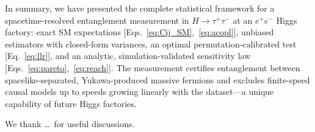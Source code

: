 \documentclass[prl,twocolumn,superscriptaddress,floatfix]{revtex4-2}
\newcommand{\ee}{e^+e^-}
\newcommand{\tautau}{\tau^+\tau^-}
\newcommand{\Htautau}{H\!\to\!\tautau}
\begin{document}
In summary, we have presented the complete statistical framework for
a spacetime-resolved entanglement measurement in $\Htautau$ at an
$\ee$ Higgs factory: exact SM expectations
[Eqs.~\eqref{eq:Cij_SM},~\eqref{eq:acopl}], unbiased estimators with
closed-form variances, an optimal permutation-calibrated test
[Eq.~\eqref{eq:llr}], and an analytic, simulation-validated
sensitivity law [Eqs.~\eqref{eq:pareto},~\eqref{eq:reach}].  The
measurement certifies entanglement between spacelike-separated,
Yukawa-produced massive fermions and excludes finite-speed causal
models up to speeds growing linearly with the dataset---a unique
capability of future Higgs factories.

\begin{acknowledgments}
We thank \ldots\ for useful discussions.
\end{acknowledgments}
\end{document}
